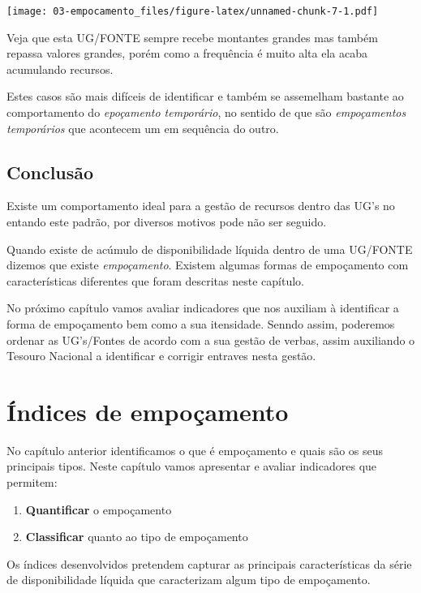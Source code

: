 \documentclass[
]{book}
\providecommand{\tightlist}{%
  \setlength{\itemsep}{0pt}\setlength{\parskip}{0pt}}
\begin{document}
\texttt{[image: 03-empocamento\_files/figure-latex/unnamed-chunk-7-1.pdf]}

Veja que esta UG/FONTE sempre recebe montantes grandes mas também repassa valores grandes, porém como a frequência é muito alta ela acaba acumulando recursos.

Estes casos são mais difíceis de identificar e também se assemelham bastante ao comportamento do \emph{epoçamento temporário}, no sentido de que são \emph{empoçamentos temporários} que acontecem um em sequência do outro.

\hypertarget{conclusuxe3o}{%
\section{Conclusão}\label{conclusuxe3o}}

Existe um comportamento ideal para a gestão de recursos dentro das UG's no entando este padrão, por diversos motivos pode não ser seguido.

Quando existe de acúmulo de disponibilidade líquida dentro de uma UG/FONTE dizemos que existe \emph{empoçamento}. Existem algumas formas de empoçamento com características diferentes que foram descritas neste capítulo.

No próximo capítulo vamos avaliar indicadores que nos auxiliam à identificar a forma de empoçamento bem como a sua itensidade. Senndo assim, poderemos ordenar as UG's/Fontes de acordo com a sua gestão de verbas, assim auxiliando o Tesouro Nacional a identificar e corrigir entraves nesta gestão.

\hypertarget{uxedndices-de-empouxe7amento}{%
\chapter{Índices de empoçamento}\label{uxedndices-de-empouxe7amento}}

No capítulo anterior identificamos o que é empoçamento e quais são os seus principais tipos. Neste capítulo vamos apresentar e avaliar indicadores que permitem:

\begin{enumerate}
\def\labelenumi{\arabic{enumi}.}
\tightlist
\item
  \textbf{Quantificar} o empoçamento
\item
  \textbf{Classificar} quanto ao tipo de empoçamento
\end{enumerate}

Os índices desenvolvidos pretendem capturar as principais características da série de disponibilidade líquida que caracterizam algum tipo de empoçamento.
\end{document}
